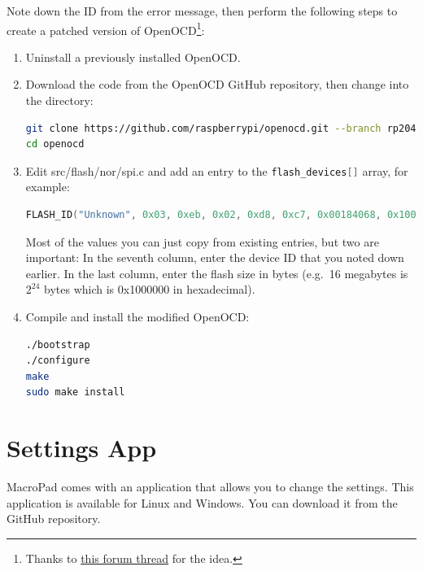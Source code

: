 \documentclass{article}
\begin{document}
Note down the ID from the error message, then perform the following steps to create a patched version of OpenOCD\footnote{Thanks to \href{https://forums.raspberrypi.com/viewtopic.php?t=359245}{this forum thread} for the idea.}:
\begin{enumerate}
\item Uninstall a previously installed OpenOCD.
\item Download the code from the OpenOCD GitHub repository, then change into the directory:
\begin{lstlisting}[language=bash]
git clone https://github.com/raspberrypi/openocd.git --branch rp2040-v0.12.0 --depth=1
cd openocd
\end{lstlisting}
\item Edit src/flash/nor/spi.c and add an entry to the \lstinline[language=C]{flash_devices[]} array, for example:
\begin{lstlisting}[language=C]
FLASH_ID("Unknown", 0x03, 0xeb, 0x02, 0xd8, 0xc7, 0x00184068, 0x100, 0x10000, 0x1000000),
\end{lstlisting}
Most of the values you can just copy from existing entries, but two are important:
In the seventh column, enter the device ID that you noted down earlier.
In the last column, enter the flash size in bytes (e.g.\ 16 megabytes is $2^{24}$ bytes which is 0x1000000 in hexadecimal).
\item Compile and install the modified OpenOCD:
\begin{lstlisting}[language=bash]
./bootstrap
./configure
make
sudo make install
\end{lstlisting}
\end{enumerate}

\section{Settings App}
MacroPad comes with an application that allows you to change the settings. This application is available for Linux and Windows. You can download it from the GitHub repository.
\end{document}
